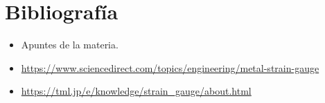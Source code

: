 \documentclass[12pt,A4]{article}
\begin{document}
\section{Bibliografía}
\begin{itemize}
    \item Apuntes de la materia.
    \item \url{https://www.sciencedirect.com/topics/engineering/metal-strain-gauge}
     \item \url{https://tml.jp/e/knowledge/strain_gauge/about.html}
\end{itemize}
\end{document}
